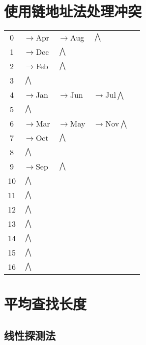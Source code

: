 \documentclass[UTF8]{ctexart}
\begin{document}
    \section{使用链地址法处理冲突}
    \begin{center}
        \begin{tabular}{|c|llll}
            \cline{1-1}
            0&$\rightarrow$Apr&$\rightarrow$Aug&$\bigwedge$   \\
           \cline{1-1}
            1&$\rightarrow$Dec&$\bigwedge$  \\
           \cline{1-1}
             2&$\rightarrow$Feb&$\bigwedge$   \\
           \cline{1-1}
             3&$\bigwedge$   \\
           \cline{1-1}
             4&$\rightarrow$Jan&$\rightarrow$Jun&$\rightarrow$Jul$\bigwedge$   \\
           \cline{1-1}
             5&$\bigwedge$   \\
           \cline{1-1}
             6&$\rightarrow$Mar&$\rightarrow$May&$\rightarrow$Nov$\bigwedge$   \\
           \cline{1-1}
             7&$\rightarrow$Oct &$\bigwedge$   \\
           \cline{1-1}
             8&$\bigwedge$   \\
           \cline{1-1}
             9&$\rightarrow$Sep &$\bigwedge$   \\
           \cline{1-1}
             10&$\bigwedge$  \\
           \cline{1-1}
             11&$\bigwedge$ \\
           \cline{1-1}
             12&$\bigwedge$ \\
           \cline{1-1}
             13&$\bigwedge$ \\
           \cline{1-1}
             14&$\bigwedge$ \\
           \cline{1-1}
             15&$\bigwedge$ \\
           \cline{1-1}
             16&$\bigwedge$ \\
           \cline{1-1}
             
        \end{tabular}
    \end{center}
    \section{平均查找长度}
    \subsection{线性探测法}
\end{document}
